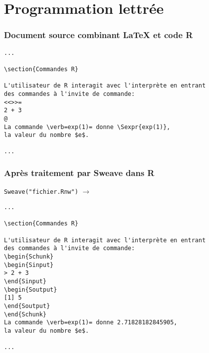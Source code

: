 \section{Programmation lettrée}

\begin{frame}[fragile=singleslide]
  \frametitle{Document source combinant {\LaTeX} et code R}

\begin{lstlisting}[emph={Sexpr}]
...

\section{Commandes R}

L'utilisateur de R interagit avec l'interprète en entrant
des commandes à l'invite de commande:
<<>>=
2 + 3
@
La commande \verb=exp(1)= donne \Sexpr{exp(1)},
la valeur du nombre $e$.

...
\end{lstlisting}
\end{frame}

\begin{frame}[fragile=singleslide]
  \frametitle{Après traitement par Sweave dans R}

  \texttt{Sweave("fichier.Rnw")}
  $\rightarrow$ 
\begin{lstlisting}[emph={Schunk,Sinput,Soutput}]
...

\section{Commandes R}

L'utilisateur de R interagit avec l'interprète en entrant
des commandes à l'invite de commande:
\begin{Schunk}
\begin{Sinput}
> 2 + 3
\end{Sinput}
\begin{Soutput}
[1] 5
\end{Soutput}
\end{Schunk}
La commande \verb=exp(1)= donne 2.71828182845905,
la valeur du nombre $e$.

...
\end{lstlisting}

\end{frame}

